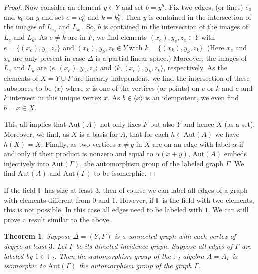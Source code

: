 \documentclass[oneside,a4paper]{amsart} %
\newtheorem{theorem}[proposition]{Theorem}
\theoremstyle{definition}
\begin{document}
\begin{proof}
Now consider an element $y\in Y$ and set $b=y^h$.
Fix two edges, (or lines)  $e_0$ and $k_0$ on $y$ and set $e=e_0^h$ and $k=k_0^h$.
Then $y$ is contained in the intersection of the images of $L_{e_0}$ and $L_{k_0}$.
So, $b$ is contained in the intersection of the images of $L_{e}$ and $L_k$.
As $e\neq k$ are in $F$,  we find elements $(x_e),y_e,z_e\in Y$ with $e=\{(x_e),y_e,z_e\}$ and 
$( x_k), y_k,z_k\in Y$ with $k=\{(x_k),y_k,z_k\}$. (Here $x_e$ and $x_k$ are only present in case $\Delta$ is a partial linear space.)
Moreover, 
the images  of $L_{e}$ and $L_k$
are $\langle e,(x_e),y_e,z_e\rangle$ and $\langle k,(x_e), y_k,z_k\rangle$, respectively. 
As the elements of $X=Y\cup F$ are linearly independent, we find the intersection of these subspaces to be
$\langle x\rangle$ where $x$ is one of the vertices (or points) on $e$ or $k$ and $e$ and $k$ intersect in this unique vertex $x$.
As $b\in\langle x\rangle$ is an idempotent, we even find $b=x\in X$.

This all implies that $\mathrm{Aut}(A)$ not only fixes $F$ but also $Y$ and hence $X$ (as a set).
Moreover, we find, as $X$ is a basis for $A$,  that for each $h\in \mathrm{Aut}(A)$ we have $h(X)=X$.
Finally, as two vertices $x\neq y$ in $X$ are on an edge with label $\alpha$ if and only if their product is nonzero and equal to $\alpha(x+y)$, 
$\mathrm{Aut}(A)$ embeds injectively into $\mathrm{Aut}(\Gamma)$, the automorphism group of the labeled graph $\Gamma$.
We find $\mathrm{Aut}(A)$  and $\mathrm{Aut}(\Gamma)$ to be isomorphic.
\end{proof}



If the field $\mathbb{F}$ has size at least $3$, then of course we can label all edges of a graph with elements different from $0$ and $1$.
However, if $\mathbb{F}$ is the field with two elements, this is not possible.
In this case all edges need to be labeled with $1$.
We can still prove a result similar to the above.



\begin{theorem}\label{autgroupthm3}
Suppose $\Delta=(Y,F)$ is a connected graph with each vertex of degree at least $3$.
Let $\Gamma$ be its directed incidence graph.
Suppose all edges of  $\Gamma$ are labeled by $1\in \mathbb{F}_2$. 
Then the automorphism group of the $\mathbb{F}_2$ algebra $A=A_\Gamma$  is isomorphic to $\mathrm{Aut}(\Gamma)$ the automorphism group of the  graph $\Gamma$.
\end{theorem}
\end{document}
